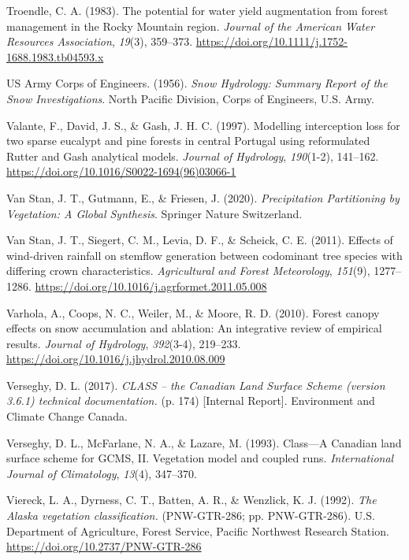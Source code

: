 \documentclass[
  letterpaper,
]{tex/uofsthesis-cs}
\newlength{\cslhangindent}
\newenvironment{CSLReferences}[2] %
 {\begin{list}{}{%
  \setlength{\itemindent}{0pt}
  \setlength{\leftmargin}{0pt}
  \setlength{\parsep}{0pt}
  \ifodd #1
   \setlength{\leftmargin}{\cslhangindent}
   \setlength{\itemindent}{-1\cslhangindent}
  \fi
  \setlength{\itemsep}{#2\baselineskip}}}
 {\end{list}}
\begin{document}
\begin{CSLReferences}{1}{0}
Troendle, C. A. (1983). The potential for water yield augmentation from
forest management in the {Rocky Mountain} region. \emph{Journal of the
American Water Resources Association}, \emph{19}(3), 359--373.
\url{https://doi.org/10.1111/j.1752-1688.1983.tb04593.x}

US Army Corps of Engineers. (1956). \emph{Snow {Hydrology}: {Summary
Report} of the {Snow Investigations}}. North Pacific Division, Corps of
Engineers, U.S. Army.

Valante, F., David, J. S., \& Gash, J. H. C. (1997). Modelling
interception loss for two sparse eucalypt and pine forests in central
{Portugal} using reformulated {Rutter} and {Gash} analytical models.
\emph{Journal of Hydrology}, \emph{190}(1-2), 141--162.
\url{https://doi.org/10.1016/S0022-1694(96)03066-1}

Van Stan, J. T., Gutmann, E., \& Friesen, J. (2020). \emph{Precipitation
{Partitioning} by {Vegetation}: {A Global Synthesis}}. Springer Nature
Switzerland.

Van Stan, J. T., Siegert, C. M., Levia, D. F., \& Scheick, C. E. (2011).
Effects of wind-driven rainfall on stemflow generation between
codominant tree species with differing crown characteristics.
\emph{Agricultural and Forest Meteorology}, \emph{151}(9), 1277--1286.
\url{https://doi.org/10.1016/j.agrformet.2011.05.008}

Varhola, A., Coops, N. C., Weiler, M., \& Moore, R. D. (2010). Forest
canopy effects on snow accumulation and ablation: {An} integrative
review of empirical results. \emph{Journal of Hydrology},
\emph{392}(3-4), 219--233.
\url{https://doi.org/10.1016/j.jhydrol.2010.08.009}

Verseghy, D. L. (2017). \emph{{CLASS} -- the {Canadian Land Surface
Scheme} (version 3.6.1) technical documentation.} (p. 174) {[}Internal
Report{]}. {Environment and Climate Change Canada}.

Verseghy, D. L., McFarlane, N. A., \& Lazare, M. (1993). Class---{A
Canadian} land surface scheme for {GCMS}, {II}. {Vegetation} model and
coupled runs. \emph{International Journal of Climatology}, \emph{13}(4),
347--370.

Viereck, L. A., Dyrness, C. T., Batten, A. R., \& Wenzlick, K. J.
(1992). \emph{The {Alaska} vegetation classification.} (PNW-GTR-286; pp.
PNW-GTR-286). U.S. Department of Agriculture, Forest Service, Pacific
Northwest Research Station. \url{https://doi.org/10.2737/PNW-GTR-286}


\end{CSLReferences}
\end{document}

